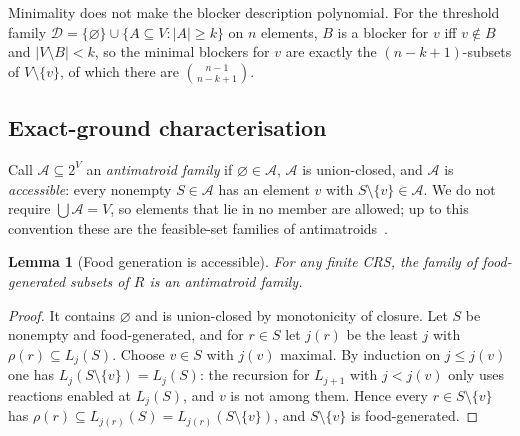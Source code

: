\documentclass[11pt,a4paper]{article}
\theoremstyle{plain}
\newtheorem{lemma}[theorem]{Lemma}
\theoremstyle{definition}
\theoremstyle{remark}
\newcommand{\AAf}{\mathcal A}
\newcommand{\DD}{\mathcal D}
\begin{document}
Minimality does not make the blocker description polynomial. For the threshold family
$\DD=\{\varnothing\}\cup\{A\subseteq V:|A|\ge k\}$ on $n$ elements, $B$ is a blocker for $v$ iff
$v\notin B$ and $|V\setminus B|<k$, so the minimal blockers for $v$ are exactly the
$(n-k+1)$-subsets of $V\setminus\{v\}$, of which there are $\binom{n-1}{n-k+1}$.

\subsection{Exact-ground characterisation}

Call $\AAf\subseteq2^V$ an \emph{antimatroid family} if $\varnothing\in\AAf$, $\AAf$ is
union-closed, and $\AAf$ is \emph{accessible}: every nonempty $S\in\AAf$ has an element $v$
with $S\setminus\{v\}\in\AAf$. We do not require $\bigcup\AAf=V$, so elements that lie in no
member are allowed; up to this convention these are the feasible-set families of
antimatroids~\cite{dilworth1940lattices,korte1991greedoids}.

\begin{lemma}[Food generation is accessible]\label{lem:accessible}
For any finite CRS, the family of food-generated subsets of $R$ is an antimatroid family.
\end{lemma}
\begin{proof}
It contains $\varnothing$ and is union-closed by monotonicity of closure. Let $S$ be
nonempty and food-generated, and for $r\in S$ let $j(r)$ be the least $j$ with
$\rho(r)\subseteq L_j(S)$. Choose $v\in S$ with $j(v)$ maximal. By induction on $j\le j(v)$
one has $L_j(S\setminus\{v\})=L_j(S)$: the recursion for $L_{j+1}$ with $j<j(v)$ only uses
reactions enabled at $L_j(S)$, and $v$ is not among them. Hence every $r\in S\setminus\{v\}$
has $\rho(r)\subseteq L_{j(r)}(S)=L_{j(r)}(S\setminus\{v\})$, and $S\setminus\{v\}$ is
food-generated.
\end{proof}
\end{document}
